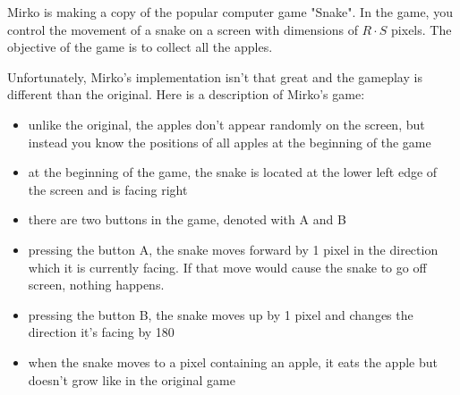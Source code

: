\renewcommand{\taskname}{ZMIJA}
\renewcommand{\timelimit}{1 second}
\renewcommand{\memorylimit}{32 MB}
\renewcommand{\score}{80 points}

Mirko is making a copy of the popular computer game "Snake". In the game, you control the movement of a snake on a screen with dimensions of $R \cdot S$ pixels. The objective of the game is to collect all the apples.

Unfortunately, Mirko's implementation isn't that great and the gameplay is different than the original. Here is a description of Mirko's game:
\begin{itemize}
\item unlike the original, the apples don't appear randomly on the screen, but instead you know the positions of all apples at the beginning of the game
\item at the beginning of the game, the snake is located at the lower left edge of the screen and is facing right
\item there are two buttons in the game, denoted with A and B
\item pressing the button A, the snake moves forward by 1 pixel in the direction which it is currently facing. If that move would cause the snake to go off screen, nothing happens.
\item pressing the button B, the snake moves up by 1 pixel and changes the direction it's facing by 180\textdegree
\item when the snake moves to a pixel containing an apple, it eats the apple but doesn't grow like in the original game
\end{itemize}

